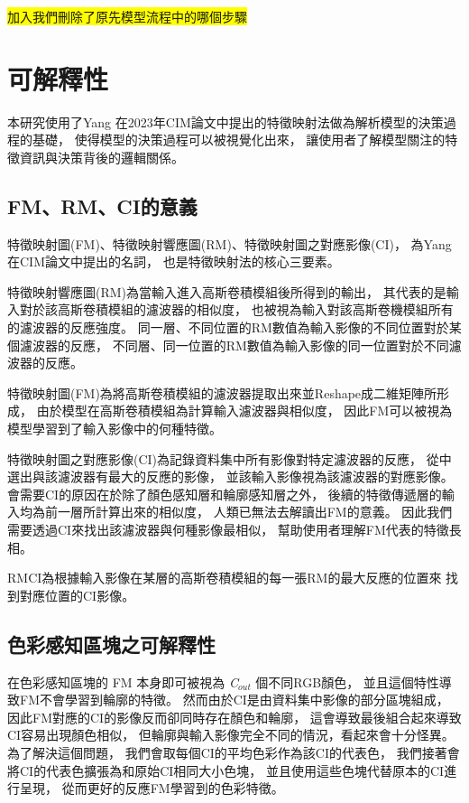 \documentclass[class=NCU_thesis, crop=false]{standalone}
\begin{document}
	\colorbox {yellow}{加入我們刪除了原先模型流程中的哪個步驟}


\pagebreak
\section{可解釋性} 
本研究使用了Yang 在2023年CIM論文中提出的特徵映射法做為解析模型的決策過程的基礎，
使得模型的決策過程可以被視覺化出來，
讓使用者了解模型關注的特徵資訊與決策背後的邏輯關係。
	
	\subsection{FM、RM、CI的意義}
	\label{section:InterablePicture}
	特徵映射圖(FM)、特徵映射響應圖(RM)、特徵映射圖之對應影像(CI)，
	為Yang在CIM論文中提出的名詞，
	也是特徵映射法的核心三要素。

	特徵映射響應圖(RM)為當輸入進入高斯卷積模組後所得到的輸出，
	其代表的是輸入對於該高斯卷積模組的濾波器的相似度，
	也被視為輸入對該高斯卷機模組所有的濾波器的反應強度。
	同一層、不同位置的RM數值為輸入影像的不同位置對於某個濾波器的反應，
	不同層、同一位置的RM數值為輸入影像的同一位置對於不同濾波器的反應。

	特徵映射圖(FM)為將高斯卷積模組的濾波器提取出來並Reshape成二維矩陣所形成，
	由於模型在高斯卷積模組為計算輸入濾波器與相似度，
	因此FM可以被視為模型學習到了輸入影像中的何種特徵。

	特徵映射圖之對應影像(CI)為記錄資料集中所有影像對特定濾波器的反應，
	從中選出與該濾波器有最大的反應的影像，
	並該輸入影像視為該濾波器的對應影像。
	會需要CI的原因在於除了顏色感知層和輪廓感知層之外，
	後續的特徵傳遞層的輸入均為前一層所計算出來的相似度，
	人類已無法去解讀出FM的意義。
	因此我們需要透過CI來找出該濾波器與何種影像最相似，
	幫助使用者理解FM代表的特徵長相。

	RM\-CI為根據輸入影像在某層的高斯卷積模組的每一張RM的最大反應的位置來
	找到對應位置的CI影像。

	\subsection{色彩感知區塊之可解釋性}
	在色彩感知區塊的 FM 本身即可被視為 \textit{C}$_{out}$ 個不同RGB顏色，
	並且這個特性導致FM不會學習到輪廓的特徵。
	然而由於CI是由資料集中影像的部分區塊組成，
	因此FM對應的CI的影像反而卻同時存在顏色和輪廓，
	這會導致最後組合起來導致CI容易出現顏色相似，
	但輪廓與輸入影像完全不同的情況，看起來會十分怪異。
	為了解決這個問題，
	我們會取每個CI的平均色彩作為該CI的代表色，
	我們接著會將CI的代表色擴張為和原始CI相同大小色塊，
	並且使用這些色塊代替原本的CI進行呈現，
	從而更好的反應FM學習到的色彩特徵。
\end{document}
